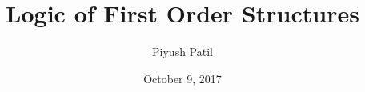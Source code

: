 \documentclass{article}
\begin{document}
\newcommand{\N}{\mathbb{N}}
\newcommand{\Z}{\mathbb{Z}}
\newcommand{\Q}{\mathbb{Q}}
\newcommand{\R}{\mathbb{R}}
\newcommand{\T}{\text{\normalfont\ T}}
\newcommand{\F}{\text{\normalfont\ F}}
\newcommand{\ti}{\textit}
\newcommand{\tb}{\textbf}
\newcommand{\n}{\leavevmode \newline}
\newcommand{\nn}{\leavevmode \newline \newline}
\def \Def#1#2{\begin{adjustwidth}{0.85cm}{0.85cm} \tb{(Definition) #1}: \ti{#2} \end{adjustwidth}}
\def \nDef#1#2{\n \Def{#1}{#2}}
\def \Defn#1#2{\Def{#1}{#2} \n}
\def \nDefn#1#2{\n \Defn{#1}{#2}}
\def \Defcont#1{\begin{adjustwidth}{0.85cm}{0.85cm} \ti{#1} \end{adjustwidth} \n}
\def \InDef#1{\ti{\begin{adjustwidth}{0.85cm}{0.85cm} #1 \end{adjustwidth}}}
\def \Thm#1#2{\begin{adjustwidth}{0.85cm}{0.85cm} \tb{(Theorem) #1}: \ti{#2} \end{adjustwidth}}
\def \nThm#1#2{\n \Thm{#1}{#2}}
\def \Thmn#1#2{\Thm{#1}{#2} \n}
\def \nThmn#1#2{\n \Thmn{#1}{#2}}
\def \InThm#1{\ti{\begin{adjustwidth}{0.85cm}{0.85cm} #1 \end{adjustwidth}}}
\def \Pf#1{\begin{adjustwidth}{0.85cm}{0.85cm} \textit{Proof}: #1 \qedsymbol \end{adjustwidth} \n}
\newcommand{\st}{\textnormal{ s.t. }}
\newcommand{\proplang}{\mathcal{L}_0}
\newcommand{\predlang}{\mathcal{L}}
\newcommand{\M}{\mathcal{M}}
\newcommand{\A}{\mathcal{A}}
\newcommand{\LA}{\predlang_\A}

\title{Logic of First Order Structures}
\author{Piyush Patil}
\date{October 9, 2017}
\maketitle
\end{document}
